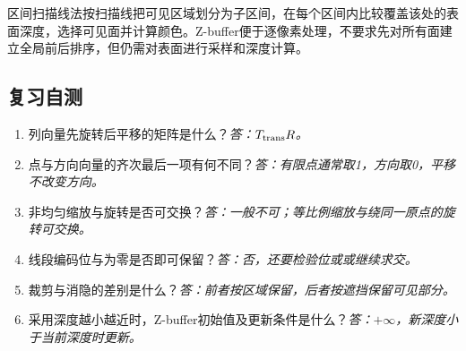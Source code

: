区间扫描线法按扫描线把可见区域划分为子区间，在每个区间内比较覆盖该处的表面深度，选择可见面并计算颜色。Z-buffer便于逐像素处理，不要求先对所有面建立全局前后排序，但仍需对表面进行采样和深度计算。

\subsection*{复习自测}
\begin{enumerate}
\item 列向量先旋转后平移的矩阵是什么？\textit{答：$T_{\rm trans}R$。}
\item 点与方向向量的齐次最后一项有何不同？\textit{答：有限点通常取1，方向取0，平移不改变方向。}
\item 非均匀缩放与旋转是否可交换？\textit{答：一般不可；等比例缩放与绕同一原点的旋转可交换。}
\item 线段编码位与为零是否即可保留？\textit{答：否，还要检验位或或继续求交。}
\item 裁剪与消隐的差别是什么？\textit{答：前者按区域保留，后者按遮挡保留可见部分。}
\item 采用深度越小越近时，Z-buffer初始值及更新条件是什么？\textit{答：$+\infty$，新深度小于当前深度时更新。}
\end{enumerate}

